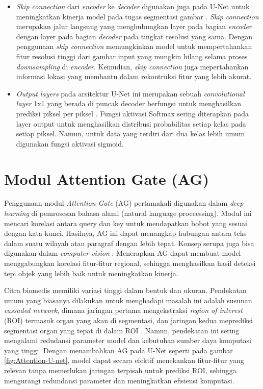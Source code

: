 \begin{itemize}
	\item \textit{Skip connection} dari \textit{encoder} ke \textit{decoder} digunakan juga pada U-Net untuk meningkatkan kinerja model pada tugas segmentasi gambar \cite{azad_medical_2022}. \textit{Skip connection}  merupakan jalur langsung yang menghubungkan layer pada bagian \textit{encoder} dengan layer pada bagian \textit{decoder} pada tingkat resolusi yang sama. Dengan penggunaan \textit{skip connection} memungkinkan model untuk mempertahankan fitur resolusi tinggi dari gambar input yang mungkin hilang selama proses \textit{downsampling} di \textit{encoder}. Kemudian,\textit{ skip connection} juga mepertahankan informasi lokasi yang membantu dalam rekontruksi fitur yang lebih akurat\cite{siddique_u-net_2020}.
	
	\item \textit{Output layers}  pada arsitektur U-Net ini merupakan sebuah \textit{convolutional layer} 1x1 yang berada di puncak decoder berfungsi untuk menghasilkan prediksi piksel per piksel \cite{huang_fully_2022,azad_medical_2022}. Fungsi aktivasi Softmax sering diterapkan pada layer output untuk menghasilkan distribusi probabilitas setiap kelas pada setiap piksel. Namun, untuk data yang terdiri dari dua kelas lebih umum digunakan fungsi aktivasi sigmoid.
	
	
\end{itemize}



\section{Modul Attention Gate (AG)}

\noindent Penggunaan modul \textit{Attention Gate} (AG) pertamakali digunakan dalam \textit{deep learning} di pemrosesan bahasa alami (natural language proccessing)\cite{azad_medical_2022}. Modul ini mencari korelasi antara query dan key untuk mendapatkan bobot yang sesuai dengan kata kunci. Hasilnya, AG ini dapat menangkap hubungan antara teks dalam suatu wilayah atau paragraf dengan lebih tepat. Konsep serupa juga bisa digunakan dalam \textit{computer vision} \cite{huang_fully_2022}. Menerapkan AG dapat membuat model menggabungkan korelasi fitur-fitur regional, sehingga menghasilkan hasil deteksi tepi objek yang lebih baik untuk meningkatkan kinerja.



\noindent Citra biomedis memiliki variasi tinggi dalam bentuk dan ukuran. Pendekatan umum yang biasanya dilakukan untuk menghadapi masalah ini adalah susunan \textit{cassaded network}, dimana jaringan pertama  mengekstraksi \textit{region of interest} (ROI) termasuk organ yang akan di segmentasi, dan jaringan kedua meprediksi segmentasi organ yang tepat di dalam ROI \cite{oktay_attention_2018}. Namun, pendekatan ini sering mengalami redudansi parameter model dan kebutuhan sumber daya komputasi yang tinggi. Dengan menambahkan AG pada U-Net seperti pada gambar \ref{fig:Attention-U-net}, model dapat secara efektif menekankan fitur-fitur yang relevan tanpa memerlukan jaringan terpisah untuk prediksi ROI, sehingga mengurangi redundansi parameter dan meningkatkan efisiensi komputasi\cite{azad_medical_2022}.

